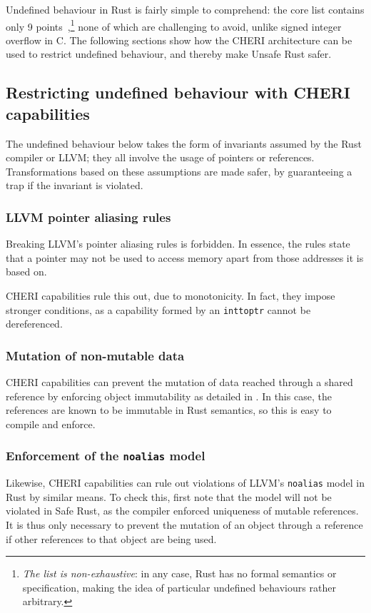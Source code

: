 \documentclass[dissertation.tex]{subfiles}
\begin{document}
Undefined behaviour in Rust is fairly simple to comprehend:
the core list contains only 9 points~\cite{rust-undef},\footnote{
\emph{The list is non-exhaustive}: in any case, Rust has no formal
semantics or specification, making the idea of particular undefined
behaviours rather arbitrary.}
none of which are challenging to avoid, unlike signed integer overflow
in C.
The following sections show how the CHERI architecture can be used to
restrict undefined behaviour, and thereby make Unsafe Rust safer.


\subsection{Restricting undefined behaviour with CHERI capabilities}
\label{sec:eval-betterunsafe-reasons}

The undefined behaviour below takes the form of invariants assumed by
the Rust compiler or LLVM; they all involve the usage of pointers or
references.
Transformations based on these assumptions are made safer, by
guaranteeing a trap if the invariant is violated.

\subsubsection{LLVM pointer aliasing rules}
Breaking LLVM's pointer aliasing rules is forbidden.
In essence, the rules state that a pointer may not be used to access
memory apart from those addresses it is based on.

CHERI capabilities rule this out, due to monotonicity.
In fact, they impose stronger conditions, as a capability formed by an
\texttt{inttoptr} cannot be dereferenced.

\subsubsection{Mutation of non-mutable data}
CHERI capabilities can prevent the mutation of data reached through a
shared reference by enforcing object immutability as detailed in
.
In this case, the references are known to be immutable in Rust
semantics, so this is easy to compile and enforce.

\subsubsection{Enforcement of the \texttt{noalias} model}
Likewise, CHERI capabilities can rule out violations of LLVM's
\texttt{noalias} model in Rust by similar means.
To check this, first note that the model will not be violated in Safe
Rust, as the compiler enforced uniqueness of mutable references.
It is thus only necessary to prevent the mutation of an object through a
reference if other references to that object are being used.
\end{document}
